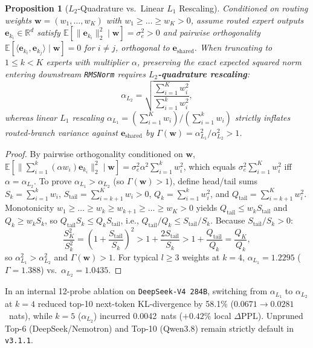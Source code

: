 \documentclass[10pt,twocolumn]{article}
\newtheorem{proposition}{Proposition}
\begin{document}
\begin{proposition}[$L_2$-Quadrature vs.\ Linear $L_1$ Rescaling]
Conditioned on routing weights $\mathbf{w} = (w_1,\dots,w_K)$ with $w_1 \ge \dots \ge w_K > 0$, assume routed expert outputs $\mathbf{e}_{k_i} \in \mathbb{R}^d$ satisfy $\mathbb{E}[\|\mathbf{e}_{k_i}\|_2^2 \mid \mathbf{w}] = \sigma_e^2 > 0$ and pairwise orthogonality $\mathbb{E}[\langle \mathbf{e}_{k_i}, \mathbf{e}_{k_j}\rangle \mid \mathbf{w}] = 0$ for $i \neq j$, orthogonal to $\mathbf{e}_{\text{shared}}$. When truncating to $1 \le k < K$ experts with multiplier $\alpha$, preserving the exact expected squared norm entering downstream \texttt{RMSNorm} requires \textbf{$L_2$-quadrature rescaling}:
\begin{equation}
    \alpha_{L_2} = \sqrt{\frac{\sum_{i=1}^{K} w_i^2}{\sum_{i=1}^{k} w_i^2}},
\end{equation}
whereas linear $L_1$ rescaling $\alpha_{L_1} = (\sum_{i=1}^K w_i)/(\sum_{i=1}^k w_i)$ strictly inflates routed-branch variance against $\mathbf{e}_{\text{shared}}$ by $\Gamma(\mathbf{w}) = \alpha_{L_1}^2 / \alpha_{L_2}^2 > 1$.
\end{proposition}

\begin{proof}
By pairwise orthogonality conditioned on $\mathbf{w}$, $\mathbb{E}[\|\sum_{i=1}^k (\alpha w_i)\mathbf{e}_{k_i}\|_2^2 \mid \mathbf{w}] = \sigma_e^2 \alpha^2 \sum_{i=1}^k w_i^2$, which equals $\sigma_e^2 \sum_{i=1}^K w_i^2$ iff $\alpha = \alpha_{L_2}$. To prove $\alpha_{L_1} > \alpha_{L_2}$ (so $\Gamma(\mathbf{w}) > 1$), define head/tail sums $S_k = \sum_{i=1}^k w_i$, $S_{\text{tail}} = \sum_{i=k+1}^K w_i > 0$, $Q_k = \sum_{i=1}^k w_i^2$, and $Q_{\text{tail}} = \sum_{i=k+1}^K w_i^2$. Monotonicity $w_1 \ge \dots \ge w_k \ge w_{k+1} \ge \dots \ge w_K > 0$ yields $Q_{\text{tail}} \le w_k S_{\text{tail}}$ and $Q_k \ge w_k S_k$, so $Q_{\text{tail}} S_k \le Q_k S_{\text{tail}}$, i.e., $Q_{\text{tail}}/Q_k \le S_{\text{tail}}/S_k$. Because $S_{\text{tail}}/S_k > 0$:
\begin{equation*}
    \frac{S_K^2}{S_k^2} = \left(1 + \frac{S_{\text{tail}}}{S_k}\right)^2 > 1 + \frac{2 S_{\text{tail}}}{S_k} > 1 + \frac{Q_{\text{tail}}}{Q_k} = \frac{Q_K}{Q_k},
\end{equation*}
so $\alpha_{L_1}^2 > \alpha_{L_2}^2$ and $\Gamma(\mathbf{w}) > 1$. For typical $l \ge 3$ weights at $k=4$, $\alpha_{L_1}=1.2295$ ($\Gamma=1.388$) vs.\ $\alpha_{L_2}=1.0435$.
\end{proof}

In an internal 12-probe ablation on \texttt{DeepSeek-V4 284B}, switching from $\alpha_{L_1}$ to $\alpha_{L_2}$ at $k=4$ reduced top-10 next-token KL-divergence by 58.1\% ($0.0671 \to 0.0281$~nats), while $k=5$ ($\alpha_{L_2}$) incurred 0.0042~nats ($+0.42\%$ local $\Delta\text{PPL}$). Unpruned Top-6 (DeepSeek/Nemotron) and Top-10 (Qwen3.8) remain strictly default in \texttt{v3.1.1}.
\end{document}
